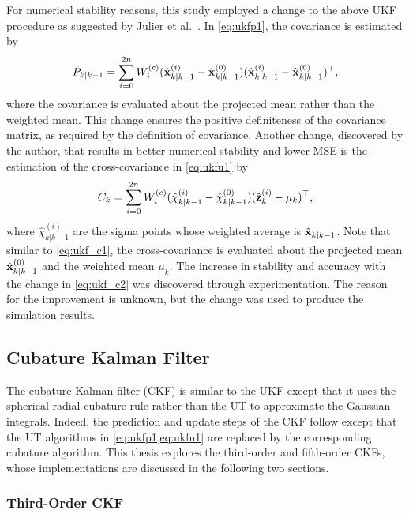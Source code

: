 \documentclass[../zhang_thesis.tex]{subfiles}
\begin{document}
For numerical stability reasons, this study employed a change to the above UKF procedure as suggested by Julier et al.~\cite{julier00}. In \cref{eq:ukfp1}, the covariance is estimated by
\begin{equation}
    \tilde{P}_{k|k-1} = \sum_{i=0}^{2n} W_i^{(c)} ( \hat{\mathbf{x}}_{k|k-1}^{(i)} - \hat{\mathbf{x}}_{k|k-1}^{(0)} ) ( \hat{\mathbf{x}}_{k|k-1}^{(i)} - \hat{\mathbf{x}}_{k|k-1}^{(0)} )^\top,
    \label{eq:ukf_c1}
\end{equation}
where the covariance is evaluated about the projected mean rather than the weighted mean. This change ensures the positive definiteness of the covariance matrix, as required by the definition of covariance. Another change, discovered by the author, that results in better numerical stability and lower MSE is the estimation of the cross-covariance in \cref{eq:ukfu1} by
\begin{equation}
    C_k = \sum_{i=0}^{2n} W_i^{(c)} ( \hat{\chi}_{k|k-1}^{(i)} - \hat{\chi}_{k|k-1}^{(0)} ) ( \hat{\mathbf{z}}_k^{(i)} - \mu_k )^\top,
    \label{eq:ukf_c2}
\end{equation}
where $\hat{\chi}_{k|k-1}^{(i)}$ are the sigma points whose weighted average is $\hat{\mathbf{x}}_{k|k-1}$. Note that similar to \cref{eq:ukf_c1}, the cross-covariance is
evaluated about the projected mean $\hat{\mathbf{x}}_{k|k-1}^{(0)}$ and the weighted mean $\mu_k$. The increase in stability and accuracy with the change in \cref{eq:ukf_c2} was discovered through experimentation. The reason for the improvement is unknown, but the change was used to produce the simulation results.

\subsection{Cubature Kalman Filter}

The cubature Kalman filter (CKF) is similar to the UKF except that it uses the spherical-radial cubature rule rather than the UT to approximate the Gaussian integrals. Indeed, the prediction and update steps of the CKF follow  except that the UT algorithms in \cref{eq:ukfp1,eq:ukfu1} are replaced by the corresponding cubature algorithm. This thesis explores the third-order and fifth-order CKFs, whose implementations are discussed in the following two sections.

\subsubsection{Third-Order CKF}
\label{sec:ckf3}
\end{document}
